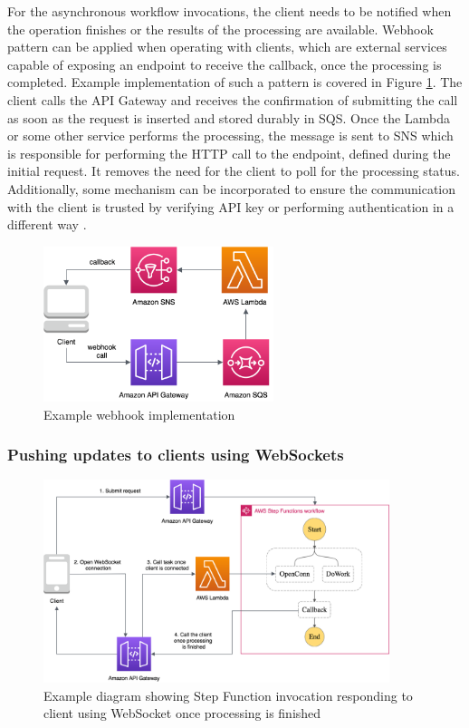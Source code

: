 For the asynchronous workflow invocations, the client needs to be notified when the operation finishes or the results of the processing are available.
Webhook pattern can be applied when operating with clients, which are external services capable of exposing an endpoint to receive the callback, once the processing is completed.
Example implementation of such a pattern is covered in Figure \ref{fig:pattern-webhook}.
The client calls the API Gateway and receives the confirmation of submitting the call as soon as the request is inserted and stored durably in SQS.
Once the Lambda or some other service performs the processing, the message is sent to SNS which is responsible for performing the HTTP call to the endpoint, defined during the initial request.
It removes the need for the client to poll for the processing status.
Additionally, some mechanism can be incorporated to ensure the communication with the client is trusted by verifying API key or performing authentication in a different way \cite{ServerlessAtScaleDesignPatternsAndOptimizations}.

\begin{figure}[H]
   \centering
   \includegraphics[width=0.6\textwidth]{assets/04-serverless-for-web-apps/webhook.png}
   \caption{Example webhook implementation}
   \label{fig:pattern-webhook}
\end{figure}

\subsubsection{Pushing updates to clients using WebSockets} \label{chapter:client-websockets}

\begin{figure}[]
   \centering
   \includegraphics[width=0.9\textwidth]{assets/04-serverless-for-web-apps/asyncStepFunction.png}
   \caption{Example diagram showing Step Function invocation responding to client using WebSocket once processing is finished}
   \label{fig:pattern-async-step-function}
\end{figure}

